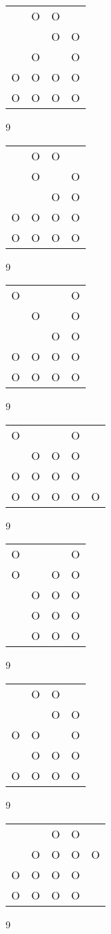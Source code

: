 \begin{tabular}{|m{0.2cm}m{0.2cm}m{0.2cm}m{0.2cm}|}\hline
 &O&O& \\
 & &O&O\\
 &O& &O\\
O&O&O&O\\
O&O&O&O\\
\hline\end{tabular}9
\begin{tabular}{|m{0.2cm}m{0.2cm}m{0.2cm}m{0.2cm}|}\hline
 &O&O& \\
 &O& &O\\
 & &O&O\\
O&O&O&O\\
O&O&O&O\\
\hline\end{tabular}9
\begin{tabular}{|m{0.2cm}m{0.2cm}m{0.2cm}m{0.2cm}|}\hline
O& & &O\\
 &O& &O\\
 & &O&O\\
O&O&O&O\\
O&O&O&O\\
\hline\end{tabular}9
\begin{tabular}{|m{0.2cm}m{0.2cm}m{0.2cm}m{0.2cm}m{0.2cm}|}\hline
O& & &O& \\
 &O&O&O& \\
O&O&O&O& \\
O&O&O&O&O\\
\hline\end{tabular}9
\begin{tabular}{|m{0.2cm}m{0.2cm}m{0.2cm}m{0.2cm}|}\hline
O& & &O\\
O& &O&O\\
 &O&O&O\\
 &O&O&O\\
 &O&O&O\\
\hline\end{tabular}9
\begin{tabular}{|m{0.2cm}m{0.2cm}m{0.2cm}m{0.2cm}|}\hline
 &O&O& \\
 & &O&O\\
O&O& &O\\
 &O&O&O\\
O&O&O&O\\
\hline\end{tabular}9
\begin{tabular}{|m{0.2cm}m{0.2cm}m{0.2cm}m{0.2cm}m{0.2cm}|}\hline
 & &O&O& \\
 &O&O&O&O\\
O&O&O&O& \\
O&O&O&O& \\
\hline\end{tabular}9
